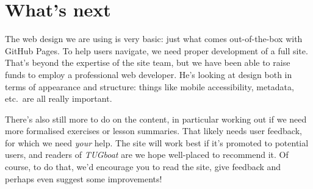 \documentclass[harvardcite]{ltugboat}
\begin{document}
\section{What's next}

The web design we are using is very basic: just what comes out-of-the-box with
GitHub Pages. To help users navigate, we need proper development of a full
site. That's beyond the expertise of the site team, but we have been able to
raise funds to employ a professional web developer. He's looking at design both
in terms of appearance and structure: things like mobile accessibility,
metadata, etc.\ are all really important.

There's also still more to do on the content, in particular working out if we
need more formalised exercises or lesson summaries. That likely needs user
feedback, for which we need \emph{your} help. The site will work best if it's
promoted to potential users, and readers of \emph{TUGboat} are we hope
well-placed to recommend it. Of course, to do that, we'd encourage you to read
the site, give feedback and perhaps even suggest some improvements!

\makesignature
\end{document}
